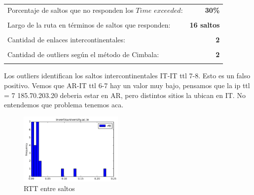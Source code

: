 \begin{center}
\begin{tabular}{p{6.5cm}r}
Porcentaje de saltos que no responden los $Time$ $exceeded$: & \textbf{30\%} \\ \\ 
Largo de la ruta en términos de saltos que responden: &\textbf{16 saltos} \\ \\
Cantidad de enlaces intercontinentales: & \textbf{2} \\ \\
Cantidad de outliers según el método de Cimbala: & \textbf{2} \\ \\
\end{tabular}
\end{center}

Los outliers identifican los saltos intercontinentales IT-IT ttl 7-8. Esto es un falso positivo. Vemos que AR-IT ttl 6-7 hay un valor muy bajo, pensamos que la ip ttl = 7 185.70.203.20 deberia estar en AR, pero distintos sitios la ubican en IT. No entendemos que problema tenemos aca.


\begin{figure}[H]
  \centering
    \includegraphics[width=0.45\textwidth]{histogramas_rtt/invertisuniversity-ac-in.png}
  \caption{RTT entre saltos}
  \label{entropia-s}
\end{figure}

\begin{center}

\end{center}

